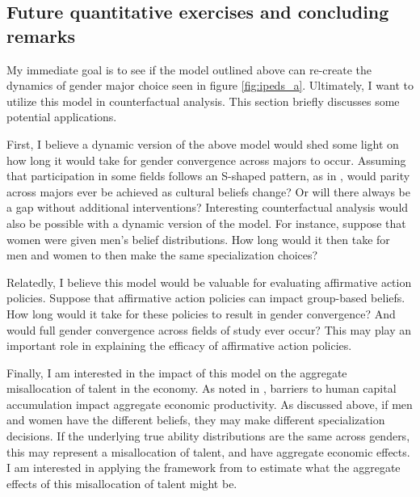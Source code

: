 \subsection{Future quantitative exercises and concluding remarks}\label{sec:extensions}

My immediate goal is to see if the model outlined above can re-create the dynamics of gender major choice seen in figure \ref{fig:ipeds_a}.
Ultimately, I want to utilize this model in counterfactual analysis.
This section briefly discusses some potential applications.

First, I believe a dynamic version of the above model would shed some light on how long it would take for gender convergence across majors to occur. 
Assuming that participation in some fields follows an S-shaped pattern, as in \textcite{F13}, would parity across majors ever be achieved as cultural beliefs change?
Or will there always be a gap without additional interventions?
Interesting counterfactual analysis would also be possible with a dynamic version of the model. 
For instance, suppose that women were given men's belief distributions.
How long would it then take for men and women to then make the same specialization choices?

Relatedly, I believe this model would be valuable for evaluating affirmative action policies.
Suppose that affirmative action policies can impact group-based beliefs.
How long would it take for these policies to result in gender convergence?
And would full gender convergence across fields of study ever occur?
This may play an important role in explaining the efficacy of affirmative action policies.

Finally, I am interested in the impact of this model on the aggregate misallocation of talent in the economy. 
As noted in \textcite{HHJK19}, barriers to human capital accumulation impact aggregate economic productivity.
As discussed above, if men and women have the different beliefs, they may make different specialization decisions.
If the underlying true ability distributions are the same across genders, this may represent a misallocation of talent, and have aggregate economic effects. 
I am interested in applying the framework from \textcite{HHJK19} to estimate what the aggregate effects of this misallocation of talent might be. 

